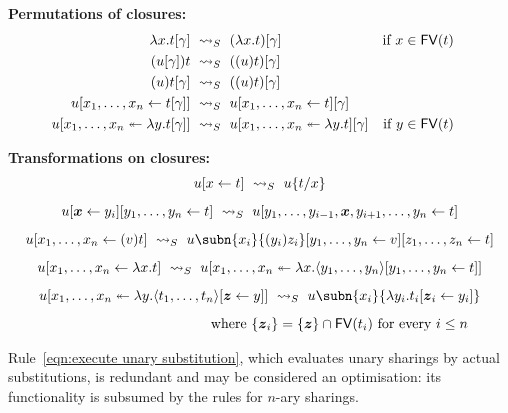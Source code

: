 \documentclass[orivec]{llncs}
\begin{document}
\noindent
{\bf Permutations of closures:}
%
\begin{align}\label{eqn:sharing above abstraction}
	\lambda x.t\g & ~\ALnotbeta~ (\lambda x.t)\g
		 & \text{if}~x\in\FV(t) &&&
\\\label{eqn:sharing above application function}
	(u\g)t & ~\ALnotbeta~ ((u)t)\g
\\\label{eqn:sharing above application argument}
	(u)t\g & ~\ALnotbeta~ ((u)t)\g
\\\label{eqn:sharing above sharing}
	u\share x{t\g} & ~\ALnotbeta~ u\share xt\g
\\\label{eqn:sharing above distribution}
	u\distr xy{t\g} & ~\ALnotbeta~ u\distr xyt\g
		& \text{if}~y\in\FV(t) &&&
\end{align}



\noindent
{\bf Transformations on closures:}
%
\begin{gather}
\label{eqn:execute unary substitution}
	u\share*xt~\ALnotbeta~u\sub xt
\\[5pt]
\label{eqn:compound sharings}
	u\share*{\vv*x}{y_i}\share yt ~\ALnotbeta~
	u\share*{y_1,\dots,y_{i-1},\vv*x,y_{i+1},\dots,y_n}{t}
\\[5pt]
\label{eqn:share application}
	u\share x{(v)t} ~\ALnotbeta~
	u\subn{x_i}{(y_i)z_i}\share yv\share zt
\\[5pt]
\label{eqn:share abstraction}
	u\share x{\lambda x.t}~\ALnotbeta~ u\distr xx{\tup y\share yt}
\\[5pt]\notag
	u\distr xy{\tup t\share*{\vv*z}{y}}~\ALnotbeta~
	u\subn{x_i}{\lambda y_i.t_i\share*{\vv*z_i}{y_i}}
\\[5pt]
	\rule{4cm}{0pt}\mbox{where } \{\vv*z_i\} = \{\vv*z\}\cap\FV(t_i) \mbox{ for every }i\leq n
\label{eqn:distributor elimination}
\end{gather}

%

\begin{remark}
Rule~\eqref{eqn:execute unary substitution}, which evaluates unary sharings by actual substitutions, is redundant and may be considered an optimisation: its functionality is subsumed by the rules for $n$-ary sharings.
\end{remark}
%
\end{document}
